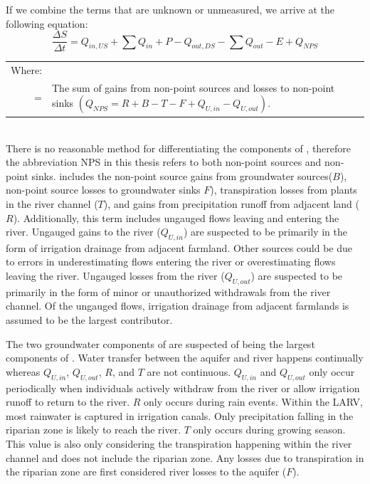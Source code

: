 \begin{linenumbers}
If we combine the terms that are unknown or unmeasured, we arrive at the following equation:
\begin{equation}\label{eq:water01}
	\frac{\Delta S}{\Delta t} = Q_{in,US} + \sum Q_{in} + P - Q_{out,DS} - \sum Q_{out} - E + Q_{NPS}
\end{equation}
\begin{tabularx}{6in}{rX}
	Where: \\
	\Qnps = & The sum of gains from non-point sources and losses to non-point sinks $ \left( Q_{NPS} = R + B - T - F + Q_{U,in} - Q_{U,out}\right) $.\\ 
\end{tabularx}\\

There is no reasonable method for differentiating the components of \Qnps, therefore the abbreviation NPS in this thesis refers to both non-point sources and non-point sinks.   \Qnps includes the non-point source gains from groundwater sources($ B $), non-point source losses to groundwater sinks {}$ F $), transpiration losses from plants in the river channel ($ T $), and gains from precipitation runoff from adjacent land ($ R $).  Additionally, this term includes ungauged flows leaving and entering the river.  Ungauged gains to the river ($ Q_{U,in} $) are suspected to be primarily in the form of irrigation drainage from adjacent farmland.  Other sources could be due to errors in underestimating flows entering the river or overestimating flows leaving the river.  Ungauged losses from the river ($ Q_{U,out} $) are suspected to be primarily in the form of minor or unauthorized withdrawals from the river channel.  Of the ungauged flows, irrigation drainage from adjacent farmlands is assumed to be the largest contributor.

The two groundwater components of \Qnps are suspected of being the largest components of \Qnps.  Water transfer between the aquifer and river happens continually whereas $ Q_{U,in} $, $ Q_{U,out} $, $ R $, and $ T $ are not continuous.  $ Q_{U,in} $ and $ Q_{U,out} $ only occur periodically when individuals actively withdraw from the river or allow irrigation runoff to return to the river.  $ R $ only occurs during rain events.  Within the LARV, most rainwater is captured in irrigation canals.  Only precipitation falling in the riparian zone is likely to reach the river.  $ T $ only occurs during growing season.  This value is also only considering the transpiration happening within the river channel and does not include the riparian zone.  Any losses due to transpiration in the riparian zone are first considered river losses to the aquifer ($ F $).



\end{linenumbers}
